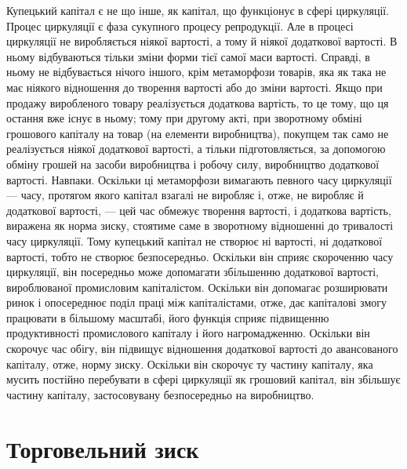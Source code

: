 Купецький капітал є не що інше, як капітал, що функціонує
в сфері циркуляції. Процес циркуляції є фаза сукупного процесу
репродукції. Але в процесі циркуляції не виробляється
ніякої вартості, а тому й ніякої додаткової вартості. В ньому
відбуваються тільки зміни форми тієї самої маси вартості. Справді,
в ньому не відбувається нічого іншого, крім метаморфози товарів,
яка як така не має ніякого відношення до творення вартості
або до зміни вартості. Якщо при продажу виробленого
товару реалізується додаткова вартість, то це тому, що ця
остання вже існує в ньому; тому при другому акті, при зворотному
обміні грошового капіталу на товар (на елементи виробництва),
покупцем так само не реалізується ніякої додаткової
вартості, а тільки підготовляється, за допомогою обміну грошей
на засоби виробництва і робочу силу, виробництво додаткової
вартості. Навпаки. Оскільки ці метаморфози вимагають певного
часу циркуляції — часу, протягом якого капітал взагалі не виробляє
і, отже, не виробляє й додаткової вартості, — цей час обмежує
творення вартості, і додаткова вартість, виражена як норма
зиску, стоятиме саме в зворотному відношенні до тривалості
часу циркуляції. Тому купецький капітал не створює ні вартості,
ні додаткової вартості, тобто не створює безпосередньо. Оскільки
він сприяє скороченню часу циркуляції, він посередньо може
допомагати збільшенню додаткової вартості, вироблюваної промисловим
капіталістом. Оскільки він допомагає розширювати
ринок і опосереднює поділ праці між капіталістами, отже, дає
капіталові змогу працювати в більшому масштабі, його функція
сприяє підвищенню продуктивності промислового капіталу і його
нагромадженню. Оскільки він скорочує час обігу, він підвищує
відношення додаткової вартості до авансованого капіталу, отже,
норму зиску. Оскільки він скорочує ту частину капіталу, яка
мусить постійно перебувати в сфері циркуляції як грошовий
капітал, він збільшує частину капіталу, застосовувану безпосередньо
на виробництво.

\section{Торговельний зиск}

